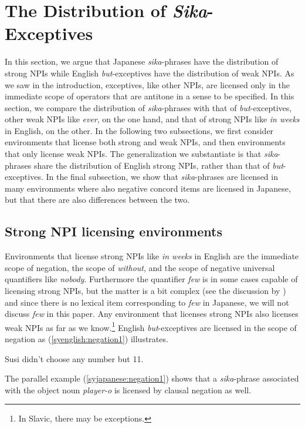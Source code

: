 \documentclass[output=paper,colorlinks,citecolor=brown,
]{langscibook}
\begin{document}
\section{The Distribution of \emph{Sika}-Exceptives}\label{sysc:data}

In this section, we argue that Japanese \emph{sika}-phrases have the distribution of strong NPIs while English \emph{but}-exceptives have the distribution of weak NPIs. As we  saw in the introduction, exceptives, like other NPIs, are licensed only in the immediate scope of operators that are antitone in a sense to be specified.
In this section, we compare the distribution of \emph{sika}-phrases with that of \emph{but}-exceptives, other weak NPIs like \emph{ever}, on the one hand, and that of strong NPIs like \emph{in weeks} in English, on the other.
In the following two subsections, we first consider environments that license both strong and weak NPIs, and then environments that only license weak NPIs.
The generalization we substantiate is that \emph{sika}-phrases share the distribution of English strong NPIs, rather than that of \emph{but}-exceptives. In the final subsection, we show that \emph{sika}-phrases are licensed in many environments where also negative concord items are licensed in Japanese, but that there are also differences between the two.




\subsection{Strong NPI licensing environments}

Environments that license strong NPIs like \emph{in weeks} in English are the immediate scope of negation, the scope of \emph{without}, and the scope of negative universal quantifiers like \emph{nobody}.  Furthermore the quantifier \emph{few} is in some cases capable of licensing strong NPIs, but the matter is a bit complex (see the discussion by \citealt{chierchia13a}) and since there is no  lexical item corresponding to \emph{few} in Japanese, we will not discuss \emph{few} in this paper. Any environment that licenses strong NPIs also licenses weak NPIs as far as we know.\footnote{In Slavic, there may be exceptions.}  English \emph{but}-exceptives are licensed in the scope of negation as (\ref{syenglish:negation1}) illustrates.

\ea \label{syenglish:negation1}
Susi didn't choose any number but 11.\z

The parallel example (\ref{syjapanese:negation1}) shows that a \emph{sika}-phrase associated with the object noun \emph{player-o} is licensed by clausal negation as well.  
\end{document}

